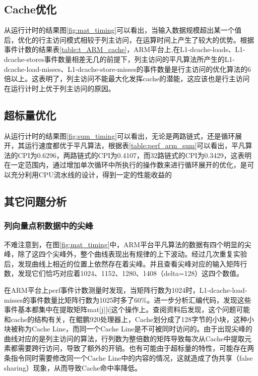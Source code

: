 \documentclass[a4paper]{article}
\begin{document}
\subsection{Cache优化}
从运行计时的结果图\ref{fig:mat_timing}可以看出，当输入数据规模超出某一个值后，优化的行主访问模式相较于列主访问，在运算时间上产生了较大的优势。根据事件计数的结果表\ref{table:t_ARM_cache}，ARM平台上,在L1-dcache-loads、L1-dcache-stores事件数量相差无几的前提下，列主访问的平凡算法所产生的L1-dcache-load-misses、L1-dcache-store-misses的事件数量是行主访问的优化算法的6倍以上。这表明了，列主访问不能最大化发挥cache的潜能，这应该也是行主访问在运行计时上优于列主访问的原因。

\subsection{超标量优化}
从运行计时的结果图\ref{fig:sum_timing}可以看出，无论是两路链式，还是循环展开，其运行速度都优于平凡算法，根据表\ref{table:perf_arm_sum}可以看出，平凡算法的CPI为0.6296，两路链式的CPI为0.4107，而32路链式的CPI为0.3429，这表明在一定范围内，通过增加单次循环中所执行的操作数来进行循环展开的优化，是可以充分利用CPU流水线的设计，得到一定的性能收益的

\subsection{其它问题分析}
\subsubsection{列向量点积数据中的尖峰}
不难注意到，在图\ref{fig:mat_timing}中，ARM平台平凡算法的数据有四个明显的尖峰，除了这四个尖峰外，整个曲线表现出有规律的上下波动。经过几次重复实验后，发现曲线上相近的位置上依然存在着尖峰。并且查看尖峰对应的输入矩阵行数，发现它们恰巧对应着1024、1152、1280、1408（delta=128）这四个数值。

在ARM平台上perf事件计数测量时发现，当矩阵行数为1024时，L1-dcache-load-misses的事件数量比矩阵行数为1025时多了60\%。进一步分析汇编代码，发现这些事件基本都集中在提取矩阵mat[j][i]这个操作上。查阅资料后发现，这个问题可能和cache的结构有关，在鲲鹏920处理器上，Cache划分成了128字节的小块，这种小块被称为Cache Line，而同一个Cache Line是不可被同时访问的。由于出现尖峰的曲线对应的是列主访问的算法，行列数为整倍数的矩阵导致每次从Cache中提取元素都需要跨行访问，导致了额外的开销。也有可能由于超标量的特性，可能存在两条指令同时需要修改同一个Cache Line中的内容的情况，这就造成了伪共享（false sharing）现象，从而导致Cache命中率降低。
\end{document}
